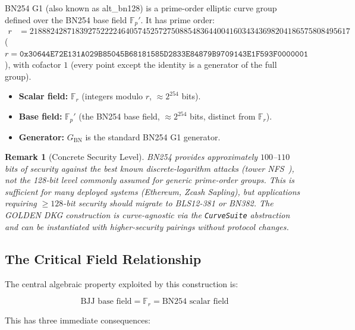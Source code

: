 \documentclass[11pt,a4paper]{article}
\newtheorem{remark}{Remark}[section]
\newcommand{\F}{\mathbb{F}}
\newcommand{\Fr}{\F_r}
\newcommand{\Fp}{\F_p}
\newcommand{\genbn}{G_{\mathrm{BN}}}
\begin{document}
BN254 G1 (also known as alt\_bn128) is a prime-order elliptic curve group
defined over the BN254 base field $\Fp'$. It has prime order:
\begin{align}
  r &= 21888242871839275222246405745257275088548364400416034343698204186575808495617
  \label{eq:r}
\end{align}
($r = \texttt{0x30644E72E131A029B85045B68181585D2833E84879B9709143E1F593F0000001}$),
with cofactor $1$ (every point except the identity is a generator of the full
group).

\begin{itemize}[nosep]
  \item \textbf{Scalar field:} $\Fr$ (integers modulo $r$, $\approx 2^{254}$ bits).
  \item \textbf{Base field:} $\Fp'$ (the BN254 base field, $\approx 2^{254}$ bits, distinct from $\Fr$).
  \item \textbf{Generator:} $\genbn$ is the standard BN254 G1 generator.
\end{itemize}

\begin{remark}[Concrete Security Level]
  \label{rem:bn254-security}
  BN254 provides approximately $100$--$110$ bits of security against the best
  known discrete-logarithm attacks (tower NFS~\cite{kb2016}), \emph{not} the
  128-bit level commonly assumed for generic prime-order groups. This is
  sufficient for many deployed systems (Ethereum, Zcash Sapling), but
  applications requiring $\ge 128$-bit security should migrate to BLS12-381 or
  BN382. The GOLDEN DKG construction is curve-agnostic via the
  \texttt{CurveSuite} abstraction and can be instantiated with higher-security
  pairings without protocol changes.
\end{remark}

\subsection{The Critical Field Relationship}
\label{sec:fieldrel}

The central algebraic property exploited by this construction is:

\begin{equation}
  \boxed{\text{BJJ base field} = \Fr = \text{BN254 scalar field}}
  \label{eq:fieldrel}
\end{equation}

This has three immediate consequences:
\end{document}
